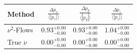     \begin{tabular}{lccc}
        \toprule
        Method & $\frac{\Delta p_x}{\langle |p_x|\rangle}$ & $\frac{\Delta p_y}{\langle |p_y|\rangle}$ & $\frac{\Delta p_z}{\langle |p_z|\rangle}$ \\
        \midrule
        $\nu^2$-Flows & $0.93_{-0.00}^{+0.00}$ & $0.93_{-0.00}^{+0.00}$ & $1.04_{-0.00}^{+0.00}$ \\
        True $\nu$ & $0.00_{-0.00}^{+0.00}$ & $0.00_{-0.00}^{+0.00}$ & $0.00_{-0.00}^{+0.00}$ \\
        \bottomrule
    \end{tabular}